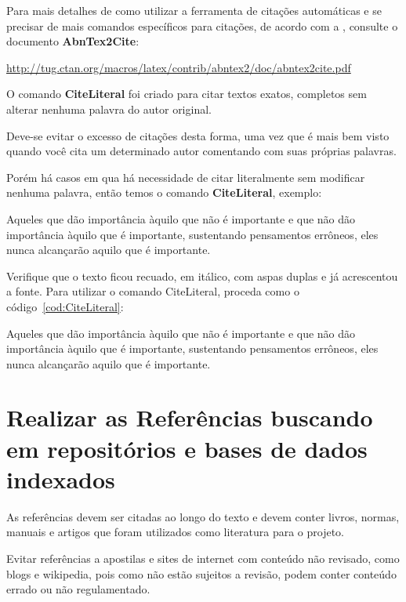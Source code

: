  Para mais detalhes de como utilizar a ferramenta de citações automáticas e se precisar de mais comandos específicos para citações, de acordo com a , consulte o documento {\bf AbnTex2Cite}:

 \url{http://tug.ctan.org/macros/latex/contrib/abntex2/doc/abntex2cite.pdf}

O comando {\bf CiteLiteral} foi criado para citar textos exatos, completos sem alterar nenhuma palavra do autor original.

Deve-se evitar o excesso de citações desta forma, uma vez que é mais bem visto quando você cita um determinado autor comentando com suas próprias palavras. 

Porém há casos em qua há necessidade de citar literalmente sem modificar nenhuma palavra, então temos o comando {\bf CiteLiteral}, exemplo:

\begin{CiteLiteral}{\cite{Buda}}
    Aqueles que dão importância àquilo que não é importante e que não dão importância àquilo que é importante, sustentando pensamentos errôneos, eles nunca alcançarão aquilo que é importante.
\end{CiteLiteral}

Verifique que o texto ficou recuado, em itálico, com aspas duplas e já acrescentou a fonte. Para utilizar o comando {CiteLiteral}, proceda como o código~\ref{cod:CiteLiteral}:

\begin{Codigo}[language=TeX, caption=Citações Literais, label=cod:CiteLiteral]
\begin{CiteLiteral}{\cite{Buda1}}
    Aqueles que dão importância àquilo que não é importante 
    e que não dão importância àquilo que é importante, 
    sustentando pensamentos errôneos, eles nunca alcançarão 
    aquilo que é importante.
\end{CiteLiteral}  
\end{Codigo}

\section{Realizar as Referências buscando em repositórios e bases de dados indexados}

As referências devem ser citadas ao longo do texto e devem conter livros, normas, manuais e artigos que foram utilizados como literatura para o projeto.
    
Evitar referências a apostilas e sites de internet com conteúdo não revisado, como blogs e wikipedia, pois como não estão sujeitos a revisão, podem conter conteúdo errado ou não regulamentado.

